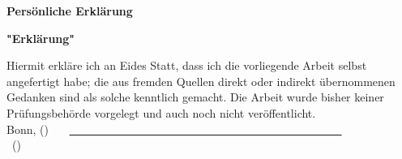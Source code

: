 \thispagestyle{empty}
\begin{center}
\huge \textbf{Persönliche Erklärung}
\end{center}
\vspace*{3cm}

\begin{center}
\huge \textbf{"Erklärung"}
\end{center}
\vspace{2cm}
Hiermit erkläre ich an Eides Statt, dass ich die vorliegende Arbeit selbst angefertigt habe; die aus fremden Quellen direkt oder indirekt übernommenen Gedanken sind als solche kenntlich gemacht.
Die Arbeit wurde bisher keiner Prüfungsbehörde vorgelegt und auch noch nicht veröffentlicht.
\vspace*{3cm}
\\
Bonn, (\ThesisPubDate) \ \ \ \underline{\ \ \ \ \ \ \ \ \ \ \ \ \ \ \ \ \ \ \ \ \ \ \ \ \ \ \ \ \ \ \ \ \ \ \ \ \ \ \ \ \ \ \ \ \ \ \ \ }\\
\hspace*{4cm} {\ (\ThesisAuthor)}
